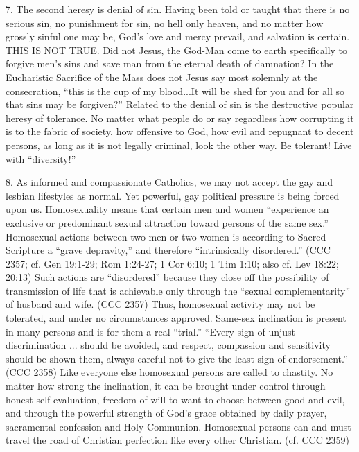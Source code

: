 \documentclass[oneside]{book}
\begin{document}
7. The second heresy is denial of sin. Having been told or taught that there is
no serious sin, no punishment for sin, no hell only heaven, and no matter how
grossly sinful one may be, God's love and mercy prevail, and salvation is
certain. THIS IS NOT TRUE. Did not Jesus, the God-Man come to earth specifically
to forgive men's sins and save man from the eternal death of damnation? In the
Eucharistic Sacrifice of the Mass does not Jesus say most solemnly at the
consecration, ``this is the cup of my blood...It will be shed for you and for
all so that sins may be forgiven?'' Related to the denial of sin is the
destructive popular heresy of tolerance. No matter what people do or say
regardless how corrupting it is to the fabric of society, how offensive to God,
how evil and repugnant to decent persons, as long as it is not legally criminal,
look the other way. Be tolerant! Live with ``diversity!''

8. As informed and compassionate Catholics, we may not accept the gay and
lesbian lifestyles as normal. Yet powerful, gay political pressure is being
forced upon us. Homosexuality means that certain men and women ``experience an
exclusive or predominant sexual attraction toward persons of the same sex.''
Homosexual actions between two men or two women is according to Sacred Scripture
a ``grave depravity,'' and therefore ``intrinsically disordered.'' (CCC 2357;
cf. Gen 19:1-29; Rom 1:24-27; 1 Cor 6:10; 1 Tim 1:10; also cf. Lev 18:22; 20:13)
Such actions are ``disordered'' because they close off the possibility of
transmission of life that is achievable only through the ``sexual
complementarity'' of husband and wife. (CCC 2357) Thus, homosexual activity may
not be tolerated, and under no circumstances approved. Same-sex inclination is
present in many persons and is for them a real ``trial.'' ``Every sign of unjust
discrimination ... should be avoided, and respect, compassion and sensitivity
should be shown them, always careful not to give the least sign of
endorsement.'' (CCC 2358)
Like everyone else homosexual persons are called to chastity. No matter how
strong the inclination, it can be brought under control through honest
self-evaluation, freedom of will to want to choose between good and evil, and
through the powerful strength of God's grace obtained by daily prayer,
sacramental confession and Holy Communion. Homosexual persons can and must
travel the road of Christian perfection like every other Christian. (cf. CCC
2359)
\end{document}
